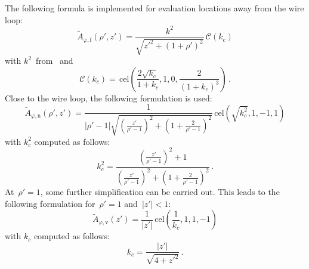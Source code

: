 The following formula is implemented for evaluation locations away from the wire loop:
\begin{equation}
  \tilde{A}_{\varphi,\mathrm{f}} (\rho',z')
  = \frac{k^2}{\sqrt{z'^2 + (1 + \rho')^2}} \,\mathcal{C}(k_c) \label{eqn:cwl_A_phi_f}
\end{equation}
with $k^2$~from~ and
\begin{equation}
  \mathcal{C}(k_c)
  = \,\mathrm{cel} \left( \frac{2 \sqrt{k_c}}{1 + k_c}, 1, 0, \frac{2}{(1 + k_c)^3} \right) \, . \label{eqn:elliptic_c}
\end{equation}
Close to the wire loop, the following formulation is used:
\begin{equation}
  \tilde{A}_{\varphi,\mathrm{n}} (\rho',z')
  = \frac{1}{|\rho' - 1| \sqrt{\left( \frac{z'}{\rho'-1} \right)^2 + \left(1 + \frac{2}{\rho'-1} \right)^2 }}
    \,\mathrm{cel}(\sqrt{k_c^2}, 1, -1, 1) \label{eqn:cwl_A_phi_n}
\end{equation}
with $k_c^2$ computed as follows:
\begin{equation}
  k_c^2 = \frac{\left( \frac{z'}{\rho'-1} \right)^2 + 1}{\left( \frac{z'}{\rho'-1} \right)^2 + \left(1 + \frac{2}{\rho'-1} \right)^2} \, .
\end{equation}
At~$\rho' = 1$, some further simplification can be carried out.
This leads to the following formulation for~$\rho' = 1$ and~$|z'| < 1$:
\begin{equation}
  \tilde{A}_{\varphi,\mathrm{v}} (z') = \frac{1}{|z'|} \,\mathrm{cel}\left(\frac{1}{k_c}, 1, 1, -1\right) \label{eqn:cwl_A_phi_v}
\end{equation}
with $k_c$ computed as follows:
\begin{equation}
  k_c = \frac{|z'|}{\sqrt{4 + {z'}^2}} \, .
\end{equation}

